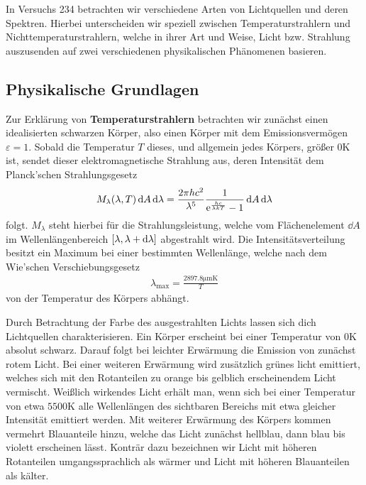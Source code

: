In Versuchs 234 betrachten wir verschiedene Arten von Lichtquellen und deren Spektren. Hierbei unterscheiden wir speziell zwischen Temperaturstrahlern und Nichttemperaturstrahlern, welche in ihrer Art und Weise, Licht bzw. Strahlung auszusenden auf zwei verschiedenen physikalischen Phänomenen basieren.

\subsection{Physikalische Grundlagen}

Zur Erklärung von \textbf{Temperaturstrahlern} betrachten wir zunächst einen idealisierten schwarzen Körper, also einen Körper mit dem Emissionsvermögen $\varepsilon = 1$. Sobald die Temperatur $T$ dieses, und allgemein jedes Körpers, größer $0 \si{\kelvin}$ ist, sendet dieser elektromagnetische Strahlung aus, deren Intensität dem Planck'schen Strahlungsgesetz
\begin{align}
  M_{\lambda} (\lambda, T) \dd{A} \dd{\lambda} = \frac{2 \pi h c^2}{\lambda^5} \frac{1}{\text{e}^{\frac{hc}{\lambda k T}} - 1} \dd{A} \dd{\lambda}
\end{align}
folgt. $M_{\lambda}$ steht hierbei für die Strahlungsleistung, welche vom Flächenelement $\dd{A}$ im Wellenlängenbereich $\qty[\lambda, \lambda + \dd{\lambda}]$ abgestrahlt wird. Die Intensitätsverteilung besitzt ein Maximum bei einer bestimmten Wellenlänge, welche nach dem Wie'schen Verschiebungsgesetz
\begin{align}
  \lambda_{\max} = \frac{2897.8 \si{\micro\meter\kelvin}}{T}
\end{align}
von der Temperatur des Körpers abhängt.

Durch Betrachtung der Farbe des ausgestrahlten Lichts lassen sich dich Lichtquellen charakterisieren. Ein Körper erscheint bei einer Temperatur von $0\si{\kelvin}$ absolut schwarz. Darauf folgt bei leichter Erwärmung die Emission von zunächst rotem Licht. Bei einer weiteren Erwärmung wird zusätzlich grünes licht emittiert, welches sich mit den Rotanteilen zu orange bis gelblich erscheinendem Licht vermischt. Weißlich wirkendes Licht erhält man, wenn sich bei einer Temperatur von etwa $5500 \si{\kelvin}$ alle Wellenlängen des sichtbaren Bereichs mit etwa gleicher Intensität emittiert werden. Mit weiterer Erwärmung des Körpers kommen vermehrt Blauanteile hinzu, welche das Licht zunächst hellblau, dann blau bis violett erscheinen lässt. Konträr dazu bezeichnen wir Licht mit höheren Rotanteilen umgangssprachlich als \glqq{}wärmer\grqq{} und Licht mit höheren Blauanteilen als \glqq{}kälter\grqq{}.

